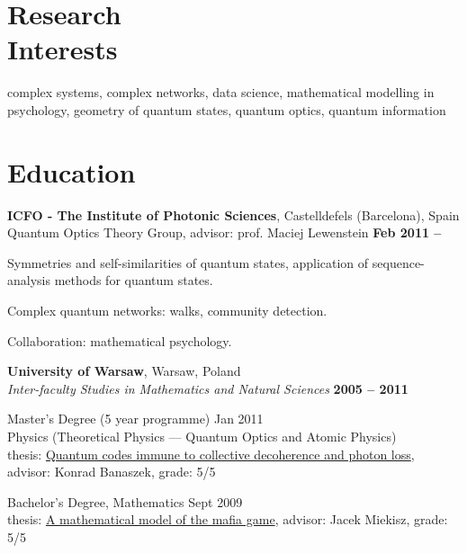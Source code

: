 \documentclass[margin,line]{resume}
\begin{document}
\begin{resume}
\vspace{3mm}

    \section{\mysidestyle Research\\Interests}
    complex systems, complex networks, data science, mathematical modelling in psychology,
    geometry of quantum states, quantum optics, quantum information

\vspace{3mm}

    \section{\mysidestyle Education}
    
    {\bf ICFO - The Institute of Photonic Sciences},  Castelldefels (Barcelona), Spain \\%
    Quantum Optics Theory Group, advisor: prof. Maciej Lewenstein \hfill {\bf Feb 2011 -- }\\
   \begin{list2}
        \vspace*{-4mm}
        \item Symmetries and self-similarities of quantum states, application of sequence-analysis methods for quantum states.
        \item Complex quantum networks: walks, community detection.
        \item Collaboration: mathematical psychology.
    \end{list2}

    {\bf University of Warsaw}, Warsaw, Poland \\
    {\sl Inter-faculty Studies in Mathematics and Natural Sciences} \hfill {\bf 2005 -- 2011}\\
    \begin{list2}
      \vspace*{-4mm}
      \item Master's Degree  (5 year programme) {\hfill Jan 2011}\\
      Physics (Theoretical Physics --- Quantum Optics and Atomic Physics)\\
      thesis: \href{http://migdal.wikidot.com/en:collective-decoherence}{Quantum codes immune to collective decoherence and photon loss},\\
      advisor: Konrad Banaszek, grade: 5/5
      \item Bachelor's Degree, Mathematics \hfill Sept 2009\\
      thesis: \href{http://migdal.wikidot.com/en:mafia}{A mathematical model of the mafia game}, advisor: Jacek Miekisz, grade: 5/5
    \end{list2}
    

\end{resume}
\end{document}
